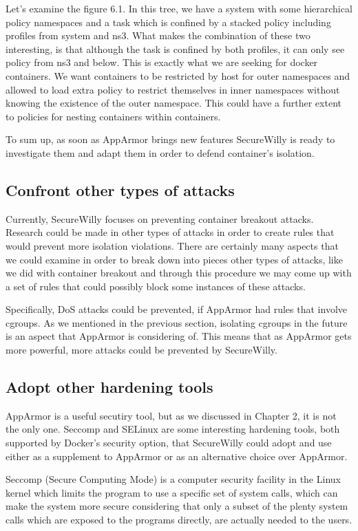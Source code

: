 Let's examine the figure 6.1. In this tree, we have a system with some hierarchical policy namespaces and a task which is confined by a stacked policy including profiles from system and ns3. What makes the combination of these two interesting, is that although the task is confined by both profiles, it can only see policy from ns3 and below. This is exactly what we are seeking for docker containers. We want containers to be restricted by host for outer namespaces and allowed to load extra policy to restrict themselves in inner namespaces without knowing the existence of the outer namespace.
This could have a further extent to policies for nesting containers within containers.

To sum up, as soon as AppArmor brings new features SecureWilly is ready to investigate them and adapt them in order to defend container's isolation.

\subsection{Confront other types of attacks}
Currently, SecureWilly focuses on preventing container breakout attacks. Research could be made in other types of attacks in order to create rules that would prevent more isolation violations. There are certainly many aspects that we could examine in order to break down into pieces other types of attacks, like we did with container breakout and through this procedure we may come up with a set of rules that could possibly block some instances of these attacks.

Specifically, DoS attacks could be prevented, if AppArmor had rules that involve cgroups. As we mentioned in the previous section, isolating cgroups in the future is an aspect that AppArmor is considering of. This means that as AppArmor gets more powerful, more attacks could be prevented by SecureWilly.

\subsection{Adopt other hardening tools}
AppArmor is a useful secutiry tool, but as we discussed in Chapter 2, it is not the only one. Seccomp and SELinux are some interesting hardening tools, both supported by Docker's security option, that SecureWilly could adopt and use either as a supplement to AppArmor or as an alternative choice over AppArmor. 

Seccomp (Secure Computing Mode) is a computer security facility in the Linux kernel which limits the program to use a specific set of system calls, which can make the system more secure considering that only a subset of the plenty system calls which are exposed to the programs directly, are actually needed to the users.

